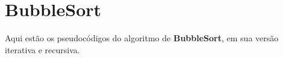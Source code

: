 \section{BubbleSort}
Aqui estão os pseudocódigos do algoritmo de \textbf{BubbleSort}, em sua versão iterativa e recursiva.
 
 

 

